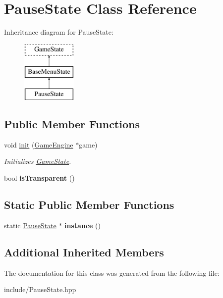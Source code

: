 \hypertarget{class_pause_state}{}\section{Pause\+State Class Reference}
\label{class_pause_state}
Inheritance diagram for Pause\+State\+:\begin{figure}[H]
\begin{center}
\leavevmode
\includegraphics[height=3.000000cm]{class_pause_state}
\end{center}
\end{figure}
\subsection*{Public Member Functions}
\begin{DoxyCompactItemize}
\item 
\mbox{\label{class_pause_state_a1e3378e3a16fc37c87c12f854d86005b}} 
void \mbox{\hyperlink{class_pause_state_a1e3378e3a16fc37c87c12f854d86005b}{init}} (\mbox{\hyperlink{class_game_engine}{Game\+Engine}} $\ast$game)
\begin{DoxyCompactList}\small\item\em Initializes \mbox{\hyperlink{class_game_state}{Game\+State}}. \end{DoxyCompactList}\item 
\mbox{\label{class_pause_state_a1d8e1f454ead5881c3ad396798eb4ac1}} 
bool {\bfseries is\+Transparent} ()
\end{DoxyCompactItemize}
\subsection*{Static Public Member Functions}
\begin{DoxyCompactItemize}
\item 
\mbox{\label{class_pause_state_ab40142d0af977bf32195e9f734bb05f1}} 
static \mbox{\hyperlink{class_pause_state}{Pause\+State}} $\ast$ {\bfseries instance} ()
\end{DoxyCompactItemize}
\subsection*{Additional Inherited Members}


The documentation for this class was generated from the following file\+:\begin{DoxyCompactItemize}
\item 
include/Pause\+State.\+hpp\end{DoxyCompactItemize}
